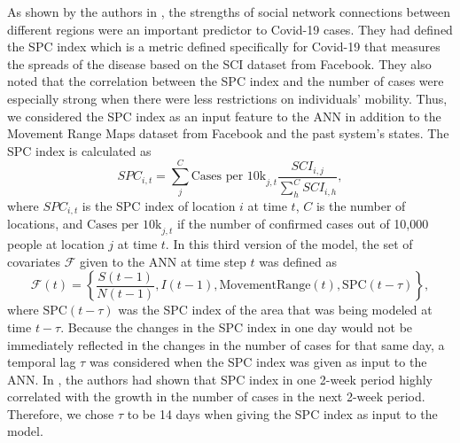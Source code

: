As shown by the authors in \cite{kuchlerGeographicSpreadCOVID192020}, the strengths of social network connections between different regions were an important predictor to Covid-19 cases.
They had defined the \gls{SPC} index which is a metric defined specifically for Covid-19 that measures the spreads of the disease based on the \gls{SCI} dataset from Facebook.
They also noted that the correlation between the \gls{SPC} index and the number of cases were especially strong when there were less restrictions on individuals' mobility.
Thus, we considered the \gls{SPC} index as an input feature to the \gls{ANN} in addition to the Movement Range Maps dataset from Facebook and the past system's states.
The \gls{SPC} index is calculated as
\begin{equation*}
    SPC_{i,t} = \sum_j^C \text{Cases per 10k}_{j,t} \frac{SCI_{i,j}}{\sum_h^C SCI_{i,h}},
\end{equation*}
where $SPC_{i,t}$ is the \gls{SPC} index of location $i$ at time $t$, $C$ is the number of locations, and $\text{Cases per 10k}_{j,t}$ if the number of confirmed cases out of 10,000 people at location $j$ at time $t$.
In this third version of the model, the set of covariates $\mathcal{F}$ given to the \gls{ANN} at time step $t$ was defined as
\begin{equation*}
    \mathcal{F}(t) = \left\lbrace \frac{S(t-1)}{N(t-1)}, I(t-1), \text{MovementRange}(t), \text{SPC}(t - \tau) \right\rbrace,
\end{equation*}
where $\text{SPC}(t - \tau)$ was the \gls{SPC} index of the area that was being modeled at time $t - \tau$.
Because the changes in the \gls{SPC} index in one day would not be immediately reflected in the changes in the number of cases for that same day, a temporal lag $\tau$ was considered when the \gls{SPC} index was given as input to the \gls{ANN}.
In \cite{kuchlerGeographicSpreadCOVID192020}, the authors had shown that \gls{SPC} index in one 2-week period highly correlated with the growth in the number of cases in the next 2-week period.
Therefore, we chose $\tau$ to be 14 days when giving the \gls{SPC} index as input to the model.